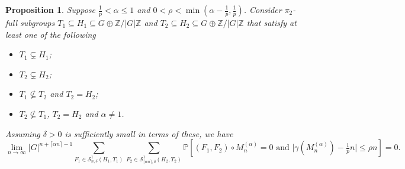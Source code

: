 \documentclass[12pt]{amsart}
\newtheorem{proposition}[theorem]{Proposition}
\theoremstyle{definition}
\newcommand{\PPP}{\mathbb{P}}
\newcommand{\SSO}[3]{\mathcal{S}^1_{#1}(#2,#3)}
\newcommand{\Mna}{M_{n}^{(\alpha)}}
\newcommand{\ZG}{\Z/\abs{G}\Z}
\newcommand{\abs}[1]{\vert#1\vert}
\newcommand{\Z}{\mathbb{Z}}
\newcommand{\ceil}[1]{\lceil#1\rceil}
\begin{document}
\begin{proposition}\label{Prop: Laplacian error term}
Suppose $\frac{1}{p}<\alpha\leq 1$ and $0<\rho< \min(\alpha-\frac{1}{p},\frac{1}{p})$.
Consider $\pi_2$-full subgroups $T_1\subseteq H_1\subseteq G\oplus\ZG$ and $T_2\subseteq H_2\subseteq G\oplus\ZG$ that satisfy at least one of the following
\begin{itemize}
    \item $T_1\subsetneq H_1$;
    \item $T_2\subsetneq H_2$;
    \item $T_1\not\subseteq T_2$ and $T_2=H_2$;
    \item $T_2\not\subseteq T_1$, $T_2=H_2$ and $\alpha\neq 1$.
\end{itemize}
Assuming $\delta>0$ is sufficiently small in terms of these, we have
\[
\lim_{n\to\infty}
\abs{G}^{n+\ceil{\alpha n}-1}
\sum_{F_1\in \SSO{n,\delta}{H_1}{T_1}}
\sum_{F_2\in \SSO{\ceil{\alpha n},\delta}{H_2}{T_2}}
\PPP[(F_1,F_2)\circ \Mna=0 \text{ and } \abs{\gamma(\Mna)-\tfrac{1}{p}n} \leq \rho n]
=0.
\]
\end{proposition}
\end{document}
